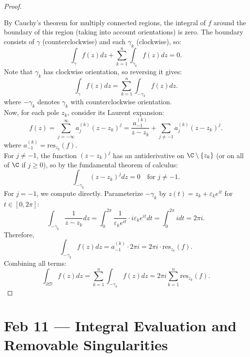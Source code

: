 \documentclass[a4paper]{article}
\begin{document}
\begin{proof}
\begin{center}
    \end{center}
    By Cauchy's theorem for multiply connected regions, the integral of $f$ around the boundary of this region (taking into account orientations) is zero. The boundary consists of $\gamma$ (counterclockwise) and each $\gamma_k$ (clockwise), so:
    \[
    \int_{\gamma} f(z)dz + \sum_{k=1}^n \int_{\gamma_k} f(z)dz = 0
    .\]
    Note that $\gamma_k$ has clockwise orientation, so reversing it gives:
    \[
    \int_{\gamma} f(z)dz = \sum_{k=1}^n \int_{-\gamma_k} f(z)dz
    .\]
    where $-\gamma_k$ denotes $\gamma_k$ with counterclockwise orientation.\\
    Now, for each pole $z_k$, consider its Laurent expansion:
    \[
    f(z) = \sum_{j=-\infty}^{\infty} a_j^{(k)}(z-z_k)^j = \frac{a_{-1}^{(k)}}{z-z_k} + \sum_{j\neq -1} a_j^{(k)}(z-z_k)^j
    .\]
    where $a_{-1}^{(k)} = \text{res}_{z_k}(f)$.\\
    For $j \neq -1$, the function $(z-z_k)^j$ has an antiderivative on $\C\setminus\{z_k\}$ (or on all of $\C$ if $j\geq 0$), so by the fundamental theorem of calculus:
    \[
    \int_{-\gamma_k} (z-z_k)^j dz = 0 \quad \text{for } j \neq -1
    .\]
    For $j=-1$, we compute directly. Parameterize $-\gamma_k$ by $z(t) = z_k + \varepsilon_k e^{it}$ for $t \in [0,2\pi]$:
    \[
    \int_{-\gamma_k} \frac{1}{z-z_k} dz = \int_0^{2\pi} \frac{1}{\varepsilon_k e^{it}} \cdot i\varepsilon_k e^{it} dt = \int_0^{2\pi} i dt = 2\pi i
    .\]
    Therefore,
    \[
    \int_{-\gamma_k} f(z)dz = a_{-1}^{(k)} \cdot 2\pi i = 2\pi i \cdot \text{res}_{z_k}(f)
    .\]
    Combining all terms:
    \[
    \int_{\partial \mathcal{D}} f(z)dz = \sum_{k=1}^n \int_{-\gamma_k} f(z)dz = 2\pi i \sum_{k=1}^n \text{res}_{z_k}(f)
    .\]
\end{proof}
\newpage
\section{Feb 11 --- Integral Evaluation and Removable Singularities}
\end{document}
